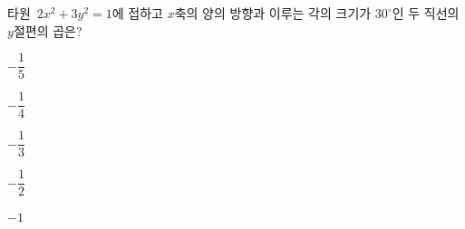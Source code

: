 타원~$2x^2+3y^2=1$에 접하고 $x$축의 양의 방향과 이루는 각의 크기가 $30^\circ$인 두 직선의 $y$절편의 곱은?
\begin{choices32}{\rule[-3ex]{0pt}{8ex}$-\dfrac{1}{5}$}{\rule[-3ex]{0pt}{8ex}$-\dfrac{1}{4}$}{\rule[-3ex]{0pt}{8ex}$-\dfrac{1}{3}$}{\rule[-3ex]{0pt}{8ex}$-\dfrac{1}{2}$}{\rule[-3ex]{0pt}{8ex}$-1$}\end{choices32}
